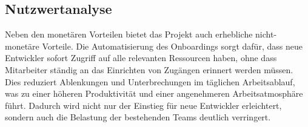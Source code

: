 \subsection{Nutzwertanalyse}
\label{sec:Nutzwertanalyse}

Neben den monetären Vorteilen bietet das Projekt auch erhebliche nicht-monetäre Vorteile. Die Automatisierung des Onboardings sorgt dafür, dass neue Entwickler sofort Zugriff auf alle relevanten Ressourcen haben, ohne dass Mitarbeiter ständig an das Einrichten von Zugängen erinnert werden müssen. Dies reduziert Ablenkungen und Unterbrechungen im täglichen Arbeitsablauf, was zu einer höheren Produktivität und einer angenehmeren Arbeitsatmosphäre führt. Dadurch wird nicht nur der Einstieg für neue Entwickler erleichtert, sondern auch die Belastung der bestehenden Teams deutlich verringert.

